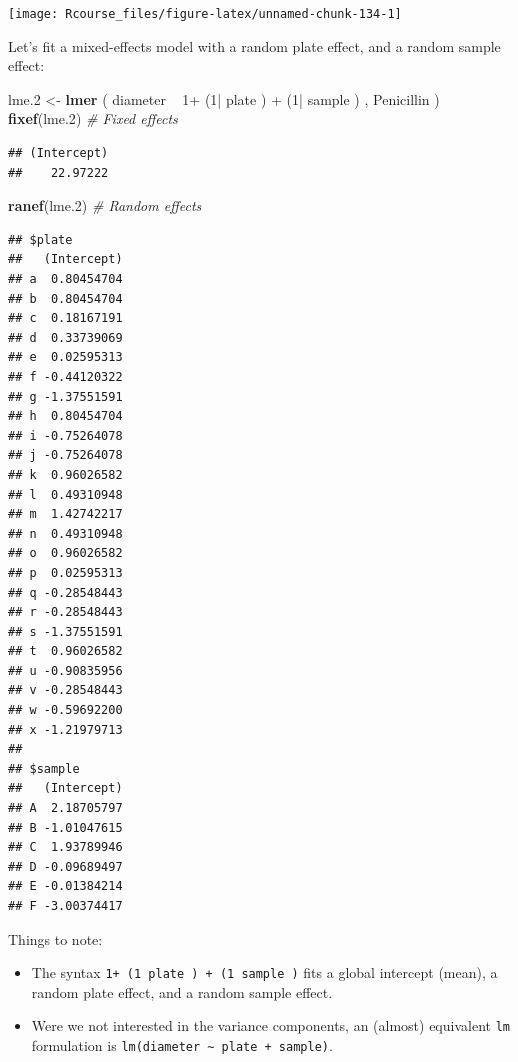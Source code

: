 \documentclass[]{book}
\newenvironment{Shaded}{\begin{snugshade}}{\end{snugshade}}
\newcommand{\KeywordTok}[1]{\textcolor[rgb]{0.13,0.29,0.53}{\textbf{{#1}}}}
\newcommand{\DecValTok}[1]{\textcolor[rgb]{0.00,0.00,0.81}{{#1}}}
\newcommand{\FloatTok}[1]{\textcolor[rgb]{0.00,0.00,0.81}{{#1}}}
\newcommand{\StringTok}[1]{\textcolor[rgb]{0.31,0.60,0.02}{{#1}}}
\newcommand{\CommentTok}[1]{\textcolor[rgb]{0.56,0.35,0.01}{\textit{{#1}}}}
\newcommand{\NormalTok}[1]{{#1}}
\providecommand{\tightlist}{%
  \setlength{\itemsep}{0pt}\setlength{\parskip}{0pt}}
\theoremstyle{definition}
\theoremstyle{definition}
\theoremstyle{remark}
\begin{document}
\texttt{[image: Rcourse\_files/figure-latex/unnamed-chunk-134-1]}

Let's fit a mixed-effects model with a random plate effect, and a random
sample effect:

\begin{Shaded}
\begin{Highlighting}[]
\NormalTok{lme}\FloatTok{.2} \NormalTok{<-}\StringTok{ }\KeywordTok{lmer} \NormalTok{( diameter ~}\StringTok{  }\DecValTok{1}\NormalTok{+}\StringTok{ }\NormalTok{(}\DecValTok{1}\NormalTok{|}\StringTok{ }\NormalTok{plate ) +}\StringTok{ }\NormalTok{(}\DecValTok{1}\NormalTok{|}\StringTok{ }\NormalTok{sample ) , Penicillin )}
\KeywordTok{fixef}\NormalTok{(lme}\FloatTok{.2}\NormalTok{) }\CommentTok{# Fixed effects}
\end{Highlighting}
\end{Shaded}

\begin{verbatim}
## (Intercept) 
##    22.97222
\end{verbatim}

\begin{Shaded}
\begin{Highlighting}[]
\KeywordTok{ranef}\NormalTok{(lme}\FloatTok{.2}\NormalTok{) }\CommentTok{# Random effects}
\end{Highlighting}
\end{Shaded}

\begin{verbatim}
## $plate
##   (Intercept)
## a  0.80454704
## b  0.80454704
## c  0.18167191
## d  0.33739069
## e  0.02595313
## f -0.44120322
## g -1.37551591
## h  0.80454704
## i -0.75264078
## j -0.75264078
## k  0.96026582
## l  0.49310948
## m  1.42742217
## n  0.49310948
## o  0.96026582
## p  0.02595313
## q -0.28548443
## r -0.28548443
## s -1.37551591
## t  0.96026582
## u -0.90835956
## v -0.28548443
## w -0.59692200
## x -1.21979713
## 
## $sample
##   (Intercept)
## A  2.18705797
## B -1.01047615
## C  1.93789946
## D -0.09689497
## E -0.01384214
## F -3.00374417
\end{verbatim}

Things to note:

\begin{itemize}
\tightlist
\item
  The syntax
  \texttt{1+\ (1\textbar{}\ plate\ )\ +\ (1\textbar{}\ sample\ )} fits a
  global intercept (mean), a random plate effect, and a random sample
  effect.
\item
  Were we not interested in the variance components, an (almost)
  equivalent \texttt{lm} formulation is
  \texttt{lm(diameter\ \textasciitilde{}\ plate\ +\ sample)}.
\end{itemize}
\end{document}
